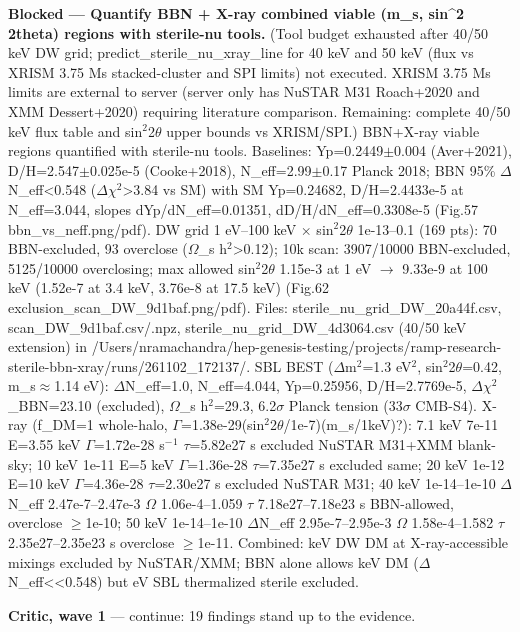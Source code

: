 \documentclass[11pt,a4paper]{article}
\begin{document}
\textbf{Blocked --- Quantify BBN + X-ray combined viable (m\_s, sin\textasciicircum{}2 2theta) regions with sterile-nu tools.} (Tool budget exhausted after 40/50 keV DW grid; predict\_sterile\_nu\_xray\_line for 40 keV and 50 keV (flux vs XRISM 3.75 Ms stacked-cluster and SPI limits) not executed. XRISM 3.75 Ms limits are external to server (server only has NuSTAR M31 Roach+2020 and XMM Dessert+2020) requiring literature comparison. Remaining: complete 40/50 keV flux table and sin$^2$2$\theta$ upper bounds vs XRISM/SPI.) BBN+X-ray viable regions quantified with sterile-nu tools. Baselines: Yp=0.2449$\pm$0.004 (Aver+2021), D/H=2.547$\pm$0.025e-5 (Cooke+2018), N\_eff=2.99$\pm$0.17 Planck 2018; BBN 95\% $\Delta$N\_eff\textless{}0.548 ($\Delta$$\chi$$^2$\textgreater{}3.84 vs SM) with SM Yp=0.24682, D/H=2.4433e-5 at N\_eff=3.044, slopes dYp/dN\_eff=0.01351, dD/H/dN\_eff=0.3308e-5 (Fig.57 bbn\_vs\_neff.png/pdf). DW grid 1 eV--100 keV $\times$ sin$^2$2$\theta$ 1e-13--0.1 (169 pts): 70 BBN-excluded, 93 overclose ($\Omega$\_s h$^2$\textgreater{}0.12); 10k scan: 3907/10000 BBN-excluded, 5125/10000 overclosing; max allowed sin$^2$2$\theta$ 1.15e-3 at 1 eV $\to$ 9.33e-9 at 100 keV (1.52e-7 at 3.4 keV, 3.76e-8 at 17.5 keV) (Fig.62 exclusion\_scan\_DW\_9d1baf.png/pdf). Files: sterile\_nu\_grid\_DW\_20a44f.csv, scan\_DW\_9d1baf.csv/.npz, sterile\_nu\_grid\_DW\_4d3064.csv (40/50 keV extension) in /Users/nramachandra/hep-genesis-testing/projects/ramp-research-sterile-bbn-xray/runs/261102\_172137/. SBL BEST ($\Delta$m$^2$=1.3 eV$^2$, sin$^2$2$\theta$=0.42, m\_s$\approx$1.14 eV): $\Delta$N\_eff=1.0, N\_eff=4.044, Yp=0.25956, D/H=2.7769e-5, $\Delta$$\chi$$^2$\_BBN=23.10 (excluded), $\Omega$\_s h$^2$=29.3, 6.2$\sigma$ Planck tension (33$\sigma$ CMB-S4). X-ray (f\_DM=1 whole-halo, $\Gamma$=1.38e-29(sin$^2$2$\theta$/1e-7)(m\_s/1keV)?): 7.1 keV 7e-11 E=3.55 keV $\Gamma$=1.72e-28 s$^-$$^1$ $\tau$=5.82e27 s excluded NuSTAR M31+XMM blank-sky; 10 keV 1e-11 E=5 keV $\Gamma$=1.36e-28 $\tau$=7.35e27 s excluded same; 20 keV 1e-12 E=10 keV $\Gamma$=4.36e-28 $\tau$=2.30e27 s excluded NuSTAR M31; 40 keV 1e-14--1e-10 $\Delta$N\_eff 2.47e-7--2.47e-3 $\Omega$ 1.06e-4--1.059 $\tau$ 7.18e27--7.18e23 s BBN-allowed, overclose $\geq$1e-10; 50 keV 1e-14--1e-10 $\Delta$N\_eff 2.95e-7--2.95e-3 $\Omega$ 1.58e-4--1.582 $\tau$ 2.35e27--2.35e23 s overclose $\geq$1e-11. Combined: keV DW DM at X-ray-accessible mixings excluded by NuSTAR/XMM; BBN alone allows keV DM ($\Delta$N\_eff\textless{}\textless{}0.548) but eV SBL thermalized sterile excluded.

\textbf{Critic, wave 1} --- continue: 19 findings stand up to the evidence.
\end{document}
